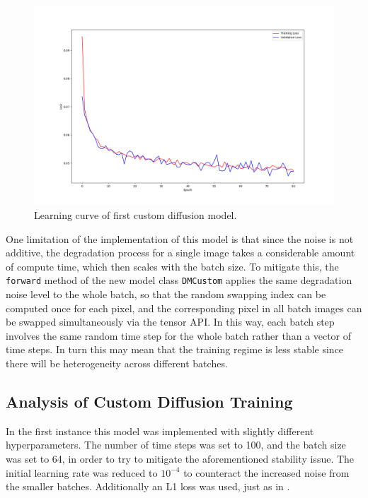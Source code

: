 \documentclass[12pt]{article}
\begin{document}
\begin{figure}[hp]
    \includegraphics[scale=0.4, center]{figures/learning_curve_9.png}
    \caption{Learning curve of first custom diffusion model.}
    \label{fig:learning_curve_9}
\end{figure}


One limitation of the implementation of this model is that since the noise is not additive,
the degradation process for a single image takes a considerable amount of compute time,
which then scales with the batch size.
To mitigate this, the \texttt{forward} method of the new model class \texttt{DMCustom} applies the same degradation noise level to the whole batch,
so that the random swapping index can be computed once for each pixel,
and the corresponding pixel in all batch images can be swapped simultaneously via the tensor API.
In this way, each batch step involves the same random time step for the whole batch rather than a vector of time steps.
In turn this may mean that the training regime is less stable since there will be heterogeneity across different batches.

\subsection{Analysis of Custom Diffusion Training}

In the first instance this model was implemented with slightly different hyperparameters.
The number of time steps was set to 100, and the batch size was set to 64, in order to try to mitigate the aforementioned stability issue.
The initial learning rate was reduced to $10^{-4}$ to counteract the increased noise from the smaller batches.
Additionally an L1 loss was used, just as in \cite{bansal2022cold}.
\end{document}
